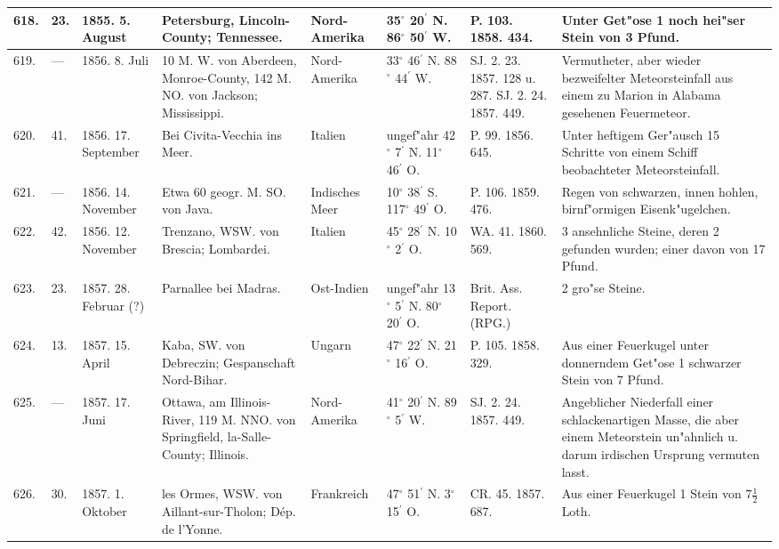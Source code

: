 \documentclass[a4paper, 8pt, oneside, polutonikogreek, german]{article}
\begin{document}
\begin{center}
\begin{longtable}{| p{5mm} | p{3mm} | p{15mm} | p{25mm} | p{20mm} | p{14mm} | p{17mm} | p{24mm} |}
        618. & 23. & 1855. 5. August & Petersburg, Lincoln-County; Tennessee. & Nord-Amerika & 35$^\circ$ 20$^\prime$ N. 86$^\circ$ 50$^\prime$ W. & P. 103. 1858. 434. & Unter Get"ose 1 noch hei"ser Stein von 3 Pfund. \\ \hline
        619. & --- & 1856. 8. Juli & 10 M. W. von Aberdeen, Monroe-County, 142 M. NO. von Jackson; Mississippi. & Nord-Amerika & 33$^\circ$ 46$^\prime$ N. 88$^\circ$ 44$^\prime$ W. & SJ. 2. 23. 1857. 128 u. 287. SJ. 2. 24. 1857. 449. & Vermutheter, aber wieder bezweifelter Meteorsteinfall aus einem zu Marion in Alabama gesehenen Feuermeteor. \\ \hline
        620. & 41. & 1856. 17. September & Bei Civita-Vecchia ins Meer. & Italien & ungef"ahr 42$^\circ$ 7$^\prime$ N. 11$^\circ$ 46$^\prime$ O. & P. 99. 1856. 645. & Unter heftigem Ger"ausch 15 Schritte von einem Schiff beobachteter Meteorsteinfall. \\ \hline
        621. & --- & 1856. 14. November & Etwa 60 geogr. M. SO. von Java. & Indisches Meer & 10$^\circ$ 38$^\prime$ S. 117$^\circ$ 49$^\prime$ O. & P. 106. 1859. 476. & Regen von schwarzen, innen hohlen, birnf"ormigen Eisenk"ugelchen. \\ \hline
        622. & 42. & 1856. 12. November & Trenzano, WSW. von Brescia; Lombardei. & Italien & 45$^\circ$ 28$^\prime$ N. 10$^\circ$ 2$^\prime$ O. & WA. 41. 1860. 569. & 3 ansehnliche Steine, deren 2 gefunden wurden; einer davon von 17 Pfund. \\ \hline
        623. & 23. & 1857. 28. Februar (?) & Parnallee bei Madras. & Ost-Indien & ungef"ahr 13$^\circ$ 5$^\prime$ N. 80$^\circ$ 20$^\prime$ O. & Brit. Ass. Report. (RPG.) & 2 gro"se Steine. \\ \hline
        624. & 13. & 1857. 15. April & Kaba, SW. von Debreczin; Gespanschaft Nord-Bihar. & Ungarn & 47$^\circ$ 22$^\prime$ N. 21$^\circ$ 16$^\prime$ O. & P. 105. 1858. 329. & Aus einer Feuerkugel unter donnerndem Get"ose 1 schwarzer Stein von 7 Pfund. \\ \hline
        625. & --- & 1857. 17. Juni & Ottawa, am Illinois-River, 119 M. NNO. von Springfield, la-Salle-County; Illinois. & Nord-Amerika & 41$^\circ$ 20$^\prime$ N. 89$^\circ$ 5$^\prime$ W. & SJ. 2. 24. 1857. 449. & Angeblicher Niederfall einer schlackenartigen Masse, die aber einem Meteorstein un"ahnlich u. darum irdischen Ursprung vermuten lasst. \\ \hline
        626. & 30. & 1857. 1. Oktober & les Ormes, WSW. von Aillant-sur-Tholon; Dép. de l'Yonne. & Frankreich & 47$^\circ$ 51$^\prime$ N. 3$^\circ$ 15$^\prime$ O. & CR. 45. 1857. 687. & Aus einer Feuerkugel 1 Stein von $7\frac{1}{2}$ Loth. \\ \hline

\end{longtable}
\end{center}
\end{document}
